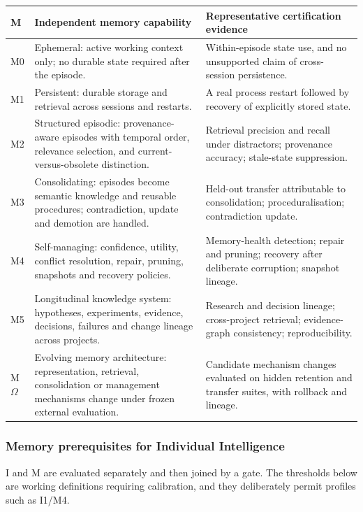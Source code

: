 \documentclass[11pt]{article}
\theoremstyle{definition}
\newcommand{\Om}{\ensuremath{\Omega}}
\begin{document}
\begin{table}[h]
\centering\small
\begin{tabularx}{\textwidth}{@{}lYZ@{}}
\toprule
M & Independent memory capability & Representative certification evidence \\
\midrule
M0 & Ephemeral: active working context only; no durable state required after the episode. & Within-episode state use, and no unsupported claim of cross-session persistence. \\
M1 & Persistent: durable storage and retrieval across sessions and restarts. & A real process restart followed by recovery of explicitly stored state. \\
M2 & Structured episodic: provenance-aware episodes with temporal order, relevance selection, and current-versus-obsolete distinction. & Retrieval precision and recall under distractors; provenance accuracy; stale-state suppression. \\
M3 & Consolidating: episodes become semantic knowledge and reusable procedures; contradiction, update and demotion are handled. & Held-out transfer attributable to consolidation; proceduralisation; contradiction update. \\
M4 & Self-managing: confidence, utility, conflict resolution, repair, pruning, snapshots and recovery policies. & Memory-health detection; repair and pruning; recovery after deliberate corruption; snapshot lineage. \\
M5 & Longitudinal knowledge system: hypotheses, experiments, evidence, decisions, failures and change lineage across projects. & Research and decision lineage; cross-project retrieval; evidence-graph consistency; reproducibility. \\
M\Om{} & Evolving memory architecture: representation, retrieval, consolidation or management mechanisms change under frozen external evaluation. & Candidate mechanism changes evaluated on hidden retention and transfer suites, with rollback and lineage. \\
\bottomrule
\end{tabularx}
\end{table}

\subsubsection{Memory prerequisites for Individual Intelligence}

I and M are evaluated separately and then joined by a gate. The thresholds below are working definitions requiring calibration, and they deliberately permit profiles such as I1/M4.
\end{document}
